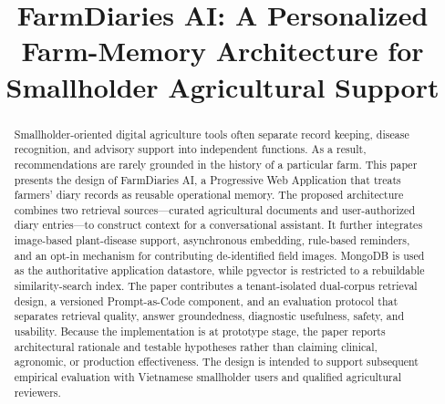 \documentclass[conference]{IEEEtran}
\begin{document}
\title{FarmDiaries AI: A Personalized Farm-Memory Architecture for Smallholder Agricultural Support}

\author{
\and
{}
\and
{}
\and
{}
}

\maketitle

\begin{abstract}
Smallholder-oriented digital agriculture tools often separate record keeping, disease recognition, and advisory support into independent functions. As a result, recommendations are rarely grounded in the history of a particular farm. This paper presents the design of FarmDiaries AI, a Progressive Web Application that treats farmers' diary records as reusable operational memory. The proposed architecture combines two retrieval sources---curated agricultural documents and user-authorized diary entries---to construct context for a conversational assistant. It further integrates image-based plant-disease support, asynchronous embedding, rule-based reminders, and an opt-in mechanism for contributing de-identified field images. MongoDB is used as the authoritative application datastore, while pgvector is restricted to a rebuildable similarity-search index. The paper contributes a tenant-isolated dual-corpus retrieval design, a versioned Prompt-as-Code component, and an evaluation protocol that separates retrieval quality, answer groundedness, diagnostic usefulness, safety, and usability. Because the implementation is at prototype stage, the paper reports architectural rationale and testable hypotheses rather than claiming clinical, agronomic, or production effectiveness. The design is intended to support subsequent empirical evaluation with Vietnamese smallholder users and qualified agricultural reviewers.

\end{abstract}
\end{document}
